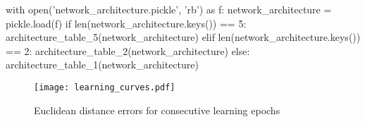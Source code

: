 \documentclass[11pt]{article}
\begin{document}
\begin{pycode}
with open('network_architecture.pickle', 'rb') as f:
    network_architecture = pickle.load(f)
if len(network_architecture.keys()) == 5:
    architecture_table_5(network_architecture)
elif len(network_architecture.keys()) == 2:
    architecture_table_2(network_architecture)
else:
    architecture_table_1(network_architecture)
\end{pycode}
    \begin{figure}[h!]
        \texttt{[image: learning\_curves.pdf]}
        \caption{Euclidean distance errors for consecutive learning epochs}
    \end{figure}
\end{document}
